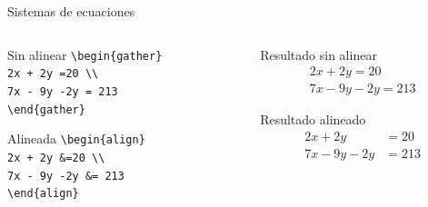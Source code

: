 \documentclass[aspectratio=169, 10pt]{beamer}
\begin{document}
\begin{frame}[fragile]{Sistemas de ecuaciones}
    \begin{columns}
        \begin{column}{0.4\linewidth}
        \begin{block}{Sin alinear}
            \verb|\begin{gather}| \\
            \hspace{1cm}\verb|2x + 2y =20 \\| \\
            \hspace{1cm}\verb|7x - 9y -2y = 213| \\
            \verb|\end{gather}| \\
        \end{block}
        \begin{block}{Alineada}
            \verb|\begin{align}| \\
            \hspace{1cm}\verb|2x + 2y &=20 \\| \\
            \hspace{1cm}\verb|7x - 9y -2y &= 213| \\
            \verb|\end{align}| \\
        \end{block}
        \end{column}
        \begin{column}{0.4\linewidth}
        \begin{exampleblock}{Resultado sin alinear}
            \begin{gather}
                2x + 2y =20 \\
                7x - 9y -2y = 213
            \end{gather}
        \end{exampleblock}
        \begin{exampleblock}{Resultado alineado}
            \begin{align}
                 2x + 2y &=20 \\
                7x - 9y -2y &= 213
            \end{align}
        \end{exampleblock}
        \end{column}
    \end{columns}
\end{frame}
\end{document}
